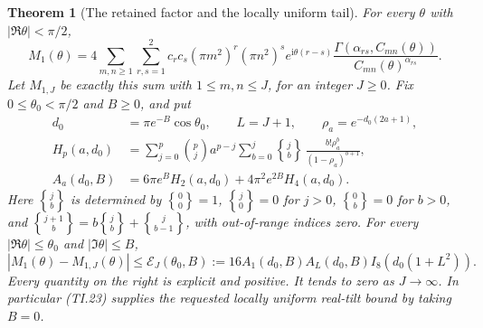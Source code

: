 \documentclass[11pt]{article}
\newtheorem{theorem}{Theorem}
\newcommand{\ii}{\mathrm i}
\begin{document}
\begin{theorem}[The retained factor and the locally uniform tail]
For every $\theta$ with $|\Re\theta|<\pi/2$,
\begin{equation}
 M_1(\theta)=4\sum_{m,n\ge1}\sum_{r,s=1}^2
 c_rc_s(\pi m^2)^r(\pi n^2)^s e^{\ii\theta(r-s)}
 \frac{\Gamma(\alpha_{rs},C_{mn}(\theta))}
 {C_{mn}(\theta)^{\alpha_{rs}}}. \tag{TI.19}
\end{equation}
Let $M_{1,J}$ be exactly this sum with $1\le m,n\le J$, for an integer
$J\ge0$. Fix $0\le\theta_0<\pi/2$ and $B\ge0$, and put
\begin{align}
 d_0&=\pi e^{-B}\cos\theta_0,\qquad L=J+1,
 \qquad \rho_a=e^{-d_0(2a+1)},\tag{TI.20}\\
 H_p(a,d_0)&=\sum_{j=0}^p\binom pj a^{p-j}
 \sum_{b=0}^j \genfrac{\{}{\}}{0pt}{}{j}{b}\,
 \frac{b!\rho_a^b}{(1-\rho_a)^{b+1}},\tag{TI.21}\\
 A_a(d_0,B)&=6\pi e^B H_2(a,d_0)+4\pi^2e^{2B}H_4(a,d_0).
 \tag{TI.22}
\end{align}
Here $\genfrac{\{}{\}}{0pt}{}{j}{b}$ is determined by $\genfrac{\{}{\}}{0pt}{}{0}{0}=1$,
$\genfrac{\{}{\}}{0pt}{}{j}{0}=0$ for $j>0$, $\genfrac{\{}{\}}{0pt}{}{0}{b}=0$ for $b>0$, and
$\genfrac{\{}{\}}{0pt}{}{j+1}{b}=b\genfrac{\{}{\}}{0pt}{}{j}{b}+\genfrac{\{}{\}}{0pt}{}{j}{b-1}$, with out-of-range
indices zero. For every $|\Re\theta|\le\theta_0$ and
$|\Im\theta|\le B$,
\begin{equation}
 |M_1(\theta)-M_{1,J}(\theta)|
 \le \mathcal E_J(\theta_0,B):=
 16A_1(d_0,B)A_L(d_0,B)I_8(d_0(1+L^2)). \tag{TI.23}
\end{equation}
Every quantity on the right is explicit and positive. It tends to zero
as $J\to\infty$. In particular (TI.23) supplies the requested locally
uniform real-tilt bound by taking $B=0$.
\end{theorem}
\end{document}
